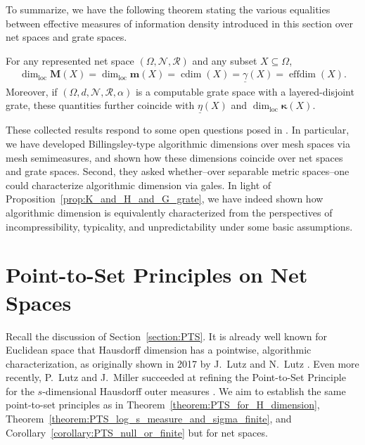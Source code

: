 To summarize, we have the following theorem stating the various equalities between effective measures of information density introduced in this section over net spaces and grate spaces. 

\begin{theorem}
    For any represented net space $(\Omega, \mathcal{N}, \mathscr{R})$ and any subset $X \subseteq \Omega$, 
    \begin{align*}
        \dim_{\operatorname{loc}}\mathbf{M}(X) = \dim_{\operatorname{loc}}\mathbf{m}(X) = \operatorname{cdim}(X) = \underline{\gamma}(X) = \operatorname{effdim}(X).
    \end{align*}
    Moreover, if $(\Omega, d, \mathcal{N}, \mathscr{R}, \alpha)$ is a computable grate space with a layered-disjoint grate, these quantities further coincide with $\underline{\eta}(X)$ and $\dim_{\operatorname{loc}}\boldsymbol{\kappa}(X)$.
    \label{theorem:effective_dimension_net_spaces}
\end{theorem}

These collected results respond to some open questions posed in \cite{LLM23}. In particular, we have developed Billingsley-type algorithmic dimensions over mesh spaces via mesh semimeasures, and shown how these dimensions coincide over net spaces and grate spaces. Second, they asked whether--over separable metric spaces--one could characterize algorithmic dimension via gales. In light of Proposition~\ref{prop:K_and_H_and_G_grate}, we have indeed shown how algorithmic dimension is equivalently characterized from the perspectives of incompressibility, typicality, and unpredictability under some basic assumptions.


\section{Point-to-Set Principles on Net Spaces}
\label{section:PTS_on_Net_Spaces}

Recall the discussion of Section~\ref{section:PTS}. It is already well known for Euclidean space that Hausdorff dimension has a pointwise, algorithmic characterization, as originally shown in 2017 by J.~Lutz and N.~Lutz \cite{LL18}. Even more recently, P.~Lutz and J.~Miller succeeded at refining the Point-to-Set Principle for the $s$-dimensional Hausdorff outer measures \cite{LM24}. We aim to establish the same point-to-set principles as in Theorem~\ref{theorem:PTS_for_H_dimension}, Theorem~\ref{theorem:PTS_log_s_measure_and_sigma_finite}, and Corollary~\ref{corollary:PTS_null_or_finite} but for net spaces.

